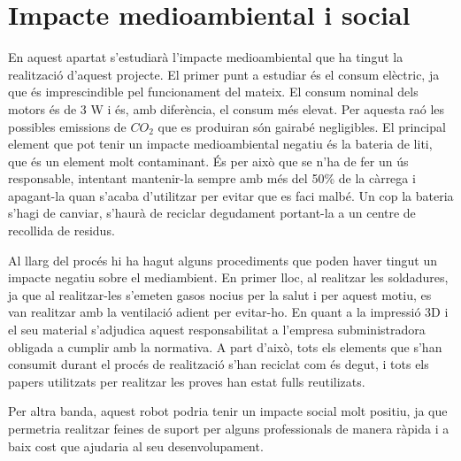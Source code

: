 \setlength\topmargin{8mm}
\onehalfspacing
\chapter{Impacte medioambiental i social} %

\label{Chapter8} %




En aquest apartat s'estudiarà l'impacte medioambiental que ha tingut la realització d'aquest projecte. El primer punt a estudiar és el consum elèctric, ja que és imprescindible pel funcionament del mateix. El consum nominal dels motors és de 3 W i és, amb diferència, el consum més elevat. Per aquesta raó les possibles emissions de $CO_{2}$ que es produiran són gairabé negligibles. El principal element que pot tenir un impacte medioambiental negatiu és la bateria de liti, que és un element molt contaminant. És per això que se n'ha de fer un ús responsable, intentant mantenir-la sempre amb més del 50\% de la càrrega i apagant-la quan s'acaba d'utilitzar per evitar que es faci malbé. Un cop la bateria s'hagi de canviar, s'haurà de reciclar degudament portant-la a un centre de recollida de residus. 

Al llarg del procés hi ha hagut alguns procediments que poden haver tingut un impacte negatiu sobre el mediambient. En primer lloc, al realitzar les soldadures, ja que al realitzar-les s'emeten gasos nocius per la salut i per aquest motiu, es van realitzar amb la ventilació adient per evitar-ho. En quant a la impressió 3D i el seu material s'adjudica aquest responsabilitat a l'empresa subministradora obligada a cumplir amb la normativa. A part d'això, tots els elements que s'han consumit durant el procés de realització s'han reciclat com és degut, i tots els papers utilitzats per realitzar les proves han estat fulls reutilizats. 

Per altra banda, aquest robot podria tenir un impacte social molt positiu, ja que permetria realitzar feines de suport per alguns professionals de manera ràpida i a baix cost que ajudaria al seu desenvolupament. 

